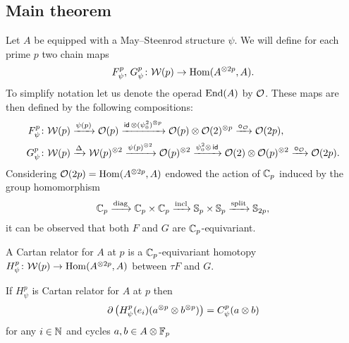 \subsection{Main theorem}\label{ss:main maps}

Let $A$ be equipped with a May--Steenrod structure $\psi$.
We will define for each prime $p$ two chain maps
\[
F_\psi^p,\, G_\psi^p \colon \mathcal{W}(p) \to \mathrm{Hom}(A^{\otimes 2p}, A).
\]
To simplify notation let us denote the operad $\mathrm{End}(A)$ by $\mathcal{O}$.
These maps are then defined by the following compositions:
\begin{align*}
	F_\psi^p \colon& \mathcal{W}(p) \xrightarrow{\psi(p)} \mathcal{O}(p) \xrightarrow{\mathsf{id}\, \otimes (\psi_0^2)^{\otimes p}}
	\mathcal{O}(p) \otimes \mathcal{O}(2)^{\otimes p} \xrightarrow{\bm{\circ}_{\mathcal{O}}}
	\mathcal{O}(2p), \\
	G_\psi^p \colon& \mathcal{W}(p) \xrightarrow{\Delta}
	\mathcal{W}(p)^{\otimes 2} \xrightarrow{\psi(p)^{\otimes 2}}
	\mathcal{O}(p)^{\otimes 2} \xrightarrow{\psi_0^2 \otimes\, \mathsf{id}}
	\mathcal{O}(2) \otimes \mathcal{O}(p)^{\otimes 2} \xrightarrow{\bm{\circ}_{\mathcal{O}}}
	\mathcal{O}(2p).
\end{align*}
Considering $\mathcal{O}(2p) = \mathrm{Hom}(A^{\otimes 2p}, A)$ endowed the action of $\mathbb{C}_p$ induced by the group homomorphism
\[
\mathbb{C}_p \xrightarrow{\mathrm{diag}} \mathbb{C}_p \times \mathbb{C}_p \xrightarrow{\mathrm{incl}} \mathbb{S}_p \times \mathbb{S}_p \xrightarrow{\mathrm{split}} \mathbb{S}_{2p},
\]
it can be observed that both $F$ and $G$ are $\mathbb{C}_p$-equivariant.

A Cartan relator for $A$ at $p$ is a $\mathbb{C}_p$-equivariant homotopy $H_\psi^p \colon \mathcal{W}(p) \to \mathrm{Hom}(A^{\otimes 2p}, A)$ between $\tau F$ and $G$.

\begin{theorem*}
	If $H_\psi^p$ is Cartan relator for $A$ at $p$ then
	\[
	\operatorname{\partial} \big(H_\psi^p(e_i)(a^{\otimes p} \otimes b^{\otimes p})\big) = C_\psi^p(a \otimes b)
	\]
	for any $i \in \mathbb{N}$ and cycles $a,b \in A \otimes {\mathbb{F}_p}$
\end{theorem*}

